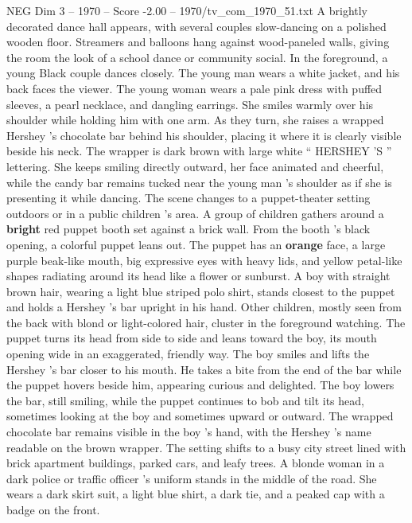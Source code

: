 \begin{textsample}{NEG Dim 3 – 1970 – Score -2.00 – 1970/tv\_com\_1970\_51.txt}  \label{ex:f3_neg_066}
A brightly decorated dance hall appears, with several couples slow-dancing on a polished wooden floor.
Streamers and balloons hang against wood-paneled walls, giving the room the look of a school dance or community social.
In the foreground, a young Black couple dances closely.
The young man wears a white jacket, and his back faces the viewer.
The young woman wears a pale pink dress with puffed sleeves, a pearl necklace, and dangling earrings.
She smiles warmly over his shoulder while holding him with one arm.
As they turn, she raises a wrapped Hershey ’s chocolate bar behind his shoulder, placing it where it is clearly visible beside his neck.
The wrapper is dark brown with large white “ HERSHEY ’S ” lettering.
She keeps smiling directly outward, her face animated and cheerful, while the candy bar remains tucked near the young man ’s shoulder as if she is presenting it while dancing.
The scene changes to a puppet-theater setting outdoors or in a public children ’s area.
A group of children gathers around a \textbf{bright} red puppet booth set against a brick wall.
From the booth ’s black opening, a colorful puppet leans out.
The puppet has an \textbf{orange} face, a large purple beak-like mouth, big expressive eyes with heavy lids, and yellow petal-like shapes radiating around its head like a flower or sunburst.
A boy with straight brown hair, wearing a light blue striped polo shirt, stands closest to the puppet and holds a Hershey ’s bar upright in his hand.
Other children, mostly seen from the back with blond or light-colored hair, cluster in the foreground watching.
The puppet turns its head from side to side and leans toward the boy, its mouth opening wide in an exaggerated, friendly way.
The boy smiles and lifts the Hershey ’s bar closer to his mouth.
He takes a bite from the end of the bar while the puppet hovers beside him, appearing curious and delighted.
The boy lowers the bar, still smiling, while the puppet continues to bob and tilt its head, sometimes looking at the boy and sometimes upward or outward.
The wrapped chocolate bar remains visible in the boy ’s hand, with the Hershey ’s name readable on the brown wrapper.
The setting shifts to a busy city street lined with brick apartment buildings, parked cars, and leafy trees.
A blonde woman in a dark police or traffic officer ’s uniform stands in the middle of the road.
She wears a dark skirt suit, a light blue shirt, a dark tie, and a peaked cap with a badge on the front.

\end{textsample}
